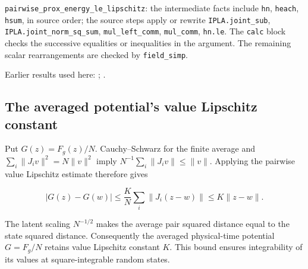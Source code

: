\documentclass[11pt,a4paper]{report}
\begin{document}
\begin{leanbox}
\texttt{pairwise\_\allowbreak{}prox\_\allowbreak{}energy\_\allowbreak{}le\_\allowbreak{}lipschitz}: the intermediate facts include \texttt{hn}, \texttt{heach}, \texttt{hsum}, in source order; the source steps apply or rewrite \texttt{IPLA.\allowbreak{}joint\_\allowbreak{}sub}, \texttt{IPLA.\allowbreak{}joint\_\allowbreak{}norm\_\allowbreak{}sq\_\allowbreak{}sum}, \texttt{mul\_\allowbreak{}left\_\allowbreak{}comm}, \texttt{mul\_\allowbreak{}comm}, \texttt{hn.\allowbreak{}le}. The \texttt{calc} block checks the successive equalities or inequalities in the argument. The remaining scalar rearrangements are checked by \texttt{field\_\allowbreak{}simp}.
\end{leanbox}


Earlier results used here: \cite[Section~3.1.1]{LangevinLean2026IPLA}; \cite[Section~3.1.2]{LangevinLean2026IPLA}.
\subsection{\texorpdfstring{The averaged potential’s value Lipschitz constant}{The averaged potential’s value Lipschitz constant}}
\label{report-step-ProximalLangevin-SplittingCoupling-lean-2}


Put \(G(z)=F_g(z)/N\). Cauchy–Schwarz for the finite average and \(\sum_i\|J_i v\|^2=N\|v\|^2\) imply \(N^{-1}\sum_i\|J_i v\|\le\|v\|\). Applying the pairwise value Lipschitz estimate therefore gives

\[|G(z)-G(w)|\le\frac KN\sum_i\|J_i(z-w)\|\le K\|z-w\|.\]

The latent scaling \(N^{-1/2}\) makes the average pair squared distance equal to the state squared distance. Consequently the averaged physical-time potential \(G=F_g/N\) retains value Lipschitz constant \(K\). This bound ensures integrability of its values at square-integrable random states.
\end{document}
